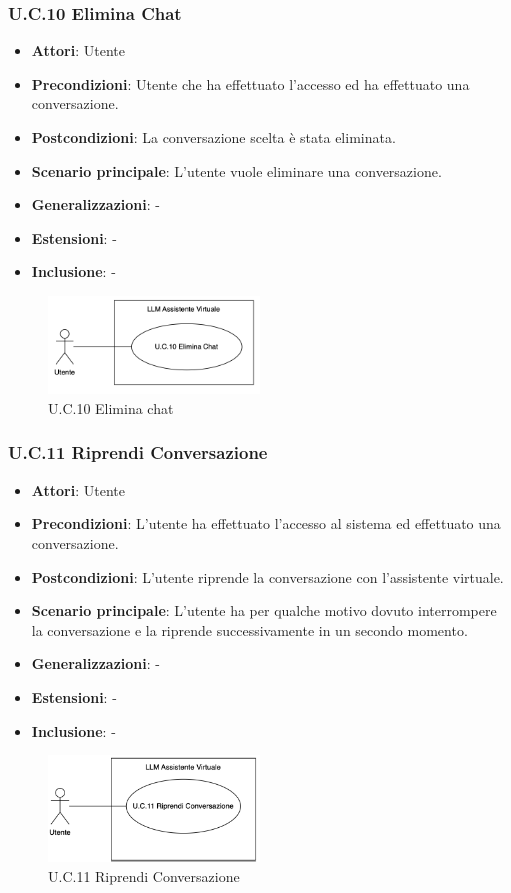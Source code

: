 \subsubsection{U.C.10 Elimina Chat}
\begin{itemize}
    \item \textbf{Attori}: Utente
    \item \textbf{Precondizioni}: Utente che ha effettuato l'accesso ed ha effettuato una conversazione.
    \item \textbf{Postcondizioni}: La conversazione scelta è stata eliminata.
    \item \textbf{Scenario principale}: L'utente vuole eliminare una conversazione.
    \item \textbf{Generalizzazioni}: -
    \item \textbf{Estensioni}: -
    \item \textbf{Inclusione}: -
\end{itemize}
\begin{figure}[H]
    \centering
    \includegraphics[width=0.5\textwidth]{img/UC10.png}
    \caption{U.C.10 Elimina chat}
\end{figure}
\newpage
\subsubsection{U.C.11 Riprendi Conversazione}
\begin{itemize}
    \item \textbf{Attori}: Utente
    \item \textbf{Precondizioni}: L’utente ha effettuato l’accesso al sistema ed effettuato una conversazione.
    \item \textbf{Postcondizioni}: L’utente riprende la conversazione con l’assistente virtuale.
    \item \textbf{Scenario principale}: L’utente ha per qualche motivo dovuto interrompere la conversazione e la riprende successivamente in un secondo momento.
    \item \textbf{Generalizzazioni}: -
    \item \textbf{Estensioni}: -
    \item \textbf{Inclusione}: -
\end{itemize}
\begin{figure}[H]
    \centering
    \includegraphics[width=0.5\textwidth]{img/UC11.png}
    \caption{U.C.11 Riprendi Conversazione}
\end{figure}
